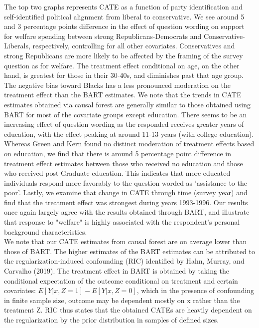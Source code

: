 \documentclass[12pt]{article}
\begin{document}
The top two graphs represents CATE as a function of party identification and self-identified political alignment from liberal to conservative. We see around 5 and 3 percentage points difference in the effect of question wording on support for welfare spending between strong Republicans-Democrats and Conservative-Liberals, respectively, controlling for all other covariates. Conservatives and strong Republicans are more likely to be affected by the framing of the survey question as for welfare. The treatment effect conditional on age, on the other hand, is greatest for those in their 30-40s, and diminishes past that age group. The negative bias toward Blacks has a less pronounced moderation on the treatment effect than the BART estimates.  We note that the trends in CATE estimates obtained via causal forest are generally similar to those obtained using BART for most of the covariate groups except education. There seems to be an increasing effect of question wording as the responded receives greater years of education, with the effect peaking at around 11-13 years (with college education). Whereas Green and Kern found no distinct moderation of treatment effects based on education, we find that there is around 5 percentage point difference in treatment effect estimates between those who received no education and those who received post-Graduate education. This indicates that more educated individuals respond more favorably to the question worded as 'assistance to the poor'. Lastly, we examine that change in CATE through time (survey year) and find that the treatment effect was strongest during years 1993-1996. Our results once again largely agree with the results obtained through BART, and illustrate that response to "welfare" is highly associated with the respondent's personal background characteristics. \\

We note that our CATE estimates from causal forest are on average lower than those of BART. The higher estimates of the BART estimates can be attributed to the regularization-induced confounding (RIC) identified by Hahn, Murray, and Carvalho (2019).\cite{CarvalhoHahnMurray} The treatment effect in BART is obtained by taking the conditional expectation of the outcome conditional on treatment and certain covariates: $E[Y|x,Z = 1] - E[Y|x,Z = 0]$, which in the presence of confounding in finite sample size, outcome may be dependent mostly on x rather than the treatment Z. RIC thus states that the obtained CATEs are heavily dependent on the regularization by the prior distribution in samples of defined sizes. \\
\end{document}
